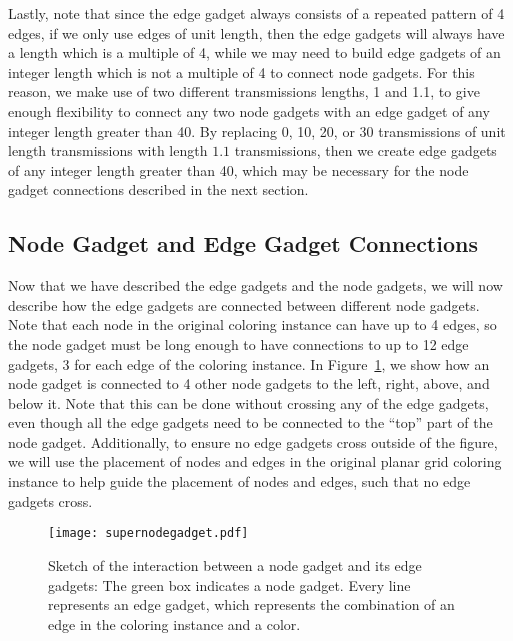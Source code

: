 \documentclass{article}
\begin{document}
Lastly, note that since the edge gadget always consists of a repeated pattern of 4 edges, if we only use edges of unit length, then the edge gadgets will always have a length which is a multiple of 4, while we may need to build edge gadgets of an integer length which is not a multiple of 4 to connect node gadgets.  For this reason, we make use of two different transmissions lengths, 1 and 1.1, to give enough flexibility to connect any two node gadgets with an edge gadget of any integer length greater than 40.  By replacing 0, 10, 20, or 30 transmissions of unit length transmissions with length $1.1$ transmissions, then we create edge gadgets of any integer length greater than 40, which may be necessary for the node gadget connections described in the next section.

\subsection{Node Gadget and Edge Gadget Connections}

Now that we have described the edge gadgets and the node gadgets, we will now describe how the edge gadgets are connected between different node gadgets.  Note that each node in the original coloring instance can have up to 4 edges, so the node gadget must be long enough to have connections to up to 12 edge gadgets, 3 for each edge of the coloring instance.  In Figure~\ref{fig:supernodegadget}, we show how an node gadget is connected to 4 other node gadgets to the left, right, above, and below it.  Note that this can be done without crossing any of the edge gadgets, even though all the edge gadgets need to be connected to the ``top'' part of the node gadget.  Additionally, to ensure no edge gadgets cross outside of the figure, we will use the placement of nodes and edges in the original planar grid coloring instance to help guide the placement of nodes and edges, such that no edge gadgets cross.

\begin{figure}
\begin{center}
\texttt{[image: supernodegadget.pdf]}
\end{center}
\caption[Sketch of a node gadget and $12$ edge gadgets]{Sketch of the interaction between a node gadget and its edge gadgets: The green box indicates a node gadget. Every line represents an edge gadget, which represents the combination of an edge in the coloring instance and a color.}
\label{fig:supernodegadget}
\end{figure}
\end{document}
